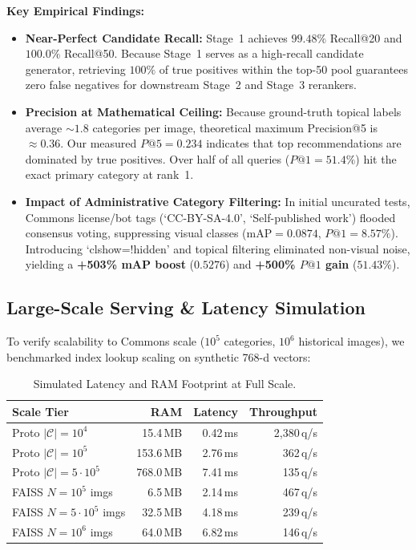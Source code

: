 \documentclass[10pt,a4paper,twocolumn]{article}
\begin{document}
\textbf{Key Empirical Findings:}
\begin{itemize}[noitemsep,topsep=1pt,leftmargin=*]
  \item \textbf{Near-Perfect Candidate Recall:} Stage~1 achieves $\mathbf{99.48\%}$ Recall@20 and $\mathbf{100.0\%}$ Recall@50. Because Stage~1 serves as a high-recall candidate generator, retrieving $100\%$ of true positives within the top-50 pool guarantees zero false negatives for downstream Stage~2 and Stage~3 rerankers.
  \item \textbf{Precision at Mathematical Ceiling:} Because ground-truth topical labels average $\sim 1.8$ categories per image, theoretical maximum Precision@5 is $\approx 0.36$. Our measured $P@5 = 0.234$ indicates that top recommendations are dominated by true positives. Over half of all queries ($P@1 = 51.4\%$) hit the exact primary category at rank~1.
  \item \textbf{Impact of Administrative Category Filtering:} In initial uncurated tests, Commons license/bot tags (`CC-BY-SA-4.0', `Self-published work') flooded consensus voting, suppressing visual classes ($\text{mAP} = 0.0874$, $P@1 = 8.57\%$). Introducing `clshow=!hidden' and topical filtering eliminated non-visual noise, yielding a \textbf{+503\% mAP boost} ($0.5276$) and \textbf{+500\% $P@1$ gain} ($51.43\%$).
\end{itemize}

\subsection{Large-Scale Serving \& Latency Simulation}
To verify scalability to Commons scale ($10^5$ categories, $10^6$ historical images), we benchmarked index lookup scaling on synthetic 768-d vectors:

\begin{table}[h]
\centering
\footnotesize
\caption{Simulated Latency and RAM Footprint at Full Scale.}
\vspace{1.5pt}
\begin{tabularx}{\columnwidth}{Xrrr}
\toprule
\textbf{Scale Tier} & \textbf{RAM} & \textbf{Latency} & \textbf{Throughput} \\
\midrule
Proto $|\mathcal{C}|=10^4$  & 15.4\,MB & 0.42\,ms & 2,380\,q/s \\
Proto $|\mathcal{C}|=10^5$  & 153.6\,MB & 2.76\,ms & 362\,q/s \\
Proto $|\mathcal{C}|=5\cdot 10^5$ & 768.0\,MB & 7.41\,ms & 135\,q/s \\
\midrule
FAISS $N=10^5$ imgs  & 6.5\,MB & 2.14\,ms & 467\,q/s \\
FAISS $N=5\cdot 10^5$ imgs & 32.5\,MB & 4.18\,ms & 239\,q/s \\
FAISS $N=10^6$ imgs   & 64.0\,MB & 6.82\,ms & 146\,q/s \\
\bottomrule
\end{tabularx}
\end{table}
\end{document}

